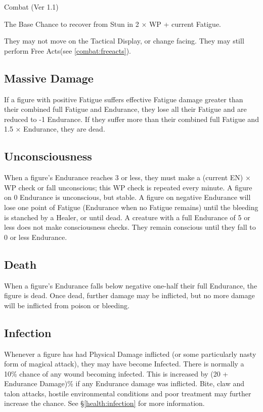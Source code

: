 \begin{Chapter}{Combat (Ver 1.1)}
\begin{Itemize}
\item The Base Chance to recover from Stun in 2 × WP + current
  Fatigue.

\item They may not move on the Tactical Display, or change facing.
  They may still perform Free Acts(see \ref{combat:freeacts}).

\end{Itemize}

\subsection{Massive Damage}

If a figure with positive Fatigue suffers effective Fatigue damage
greater than their combined full Fatigue and Endurance, they lose all
their Fatigue and are reduced to -1 Endurance.  If they suffer more
than their combined full Fatigue and 1.5 × Endurance, they are dead.

\subsection{Unconsciousness}

When a figure’s Endurance reaches 3 or less, they must make a (current
EN) × WP check or fall unconscious; this WP check is repeated every
minute.  A figure on 0 Endurance is unconscious, but stable.  A figure
on negative Endurance will lose one point of Fatigue (Endurance when
no Fatigue remains) until the bleeding is stanched by a Healer, or
until dead. A creature with a full Endurance of 5 or less does not
make consciousness checks.  They remain conscious until they fall to 0
or less Endurance.

\subsection{Death}

When a figure’s Endurance falls below negative one-half their full
Endurance, the figure is dead.  Once dead, further damage may be
inflicted, but no more damage will be inflicted from poison or
bleeding.

\subsection{Infection}

Whenever a figure has had Physical Damage inflicted (or some
particularly nasty form of magical attack), they may have become
Infected.  There is normally a 10\% chance of any wound becoming
infected.  This is increased by (20 + Endurance Damage)\% if any
Endurance damage was inflicted.  Bite, claw and talon attacks, hostile
environmental conditions and poor treatment may further increase the
chance. See \S\ref{health:infection} for more information.


\end{Chapter}
